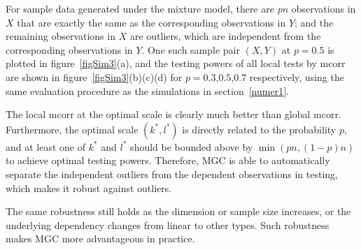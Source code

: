 \documentclass[11pt]{article}
\begin{document}
For sample data generated under the mixture model, there are $pn$ observations in $X$ that are exactly the same as the corresponding observations in $Y$; and the remaining observations in $X$ are outliers, which are independent from the corresponding observations in $Y$. One such sample pair $(X,Y)$ at $p=0.5$ is plotted in figure~\ref{figSim3}(a), and the testing powers of all local tests by mcorr are shown in figure~\ref{figSim3}(b)(c)(d) for $p=0.3$,$0.5$,$0.7$ respectively, using the same evaluation procedure as the simulations in section~\ref{numer1}.

The local mcorr at the optimal scale is clearly much better than global mcorr. Furthermore, the optimal scale $(k^{*},l^{*})$ is directly related to the probability $p$, and at least one of $k^{*}$ and $l^{*}$ should be bounded above by $\min(pn,(1-p)n)$ to achieve optimal testing powers. Therefore, MGC is able to automatically separate the independent outliers from the dependent observations in testing, which makes it robust against outliers.

The same robustness still holds as the dimension or sample size increases, or the underlying dependency changes from linear to other types. Such robustness makes MGC more advantageous in practice. 
\end{document}

